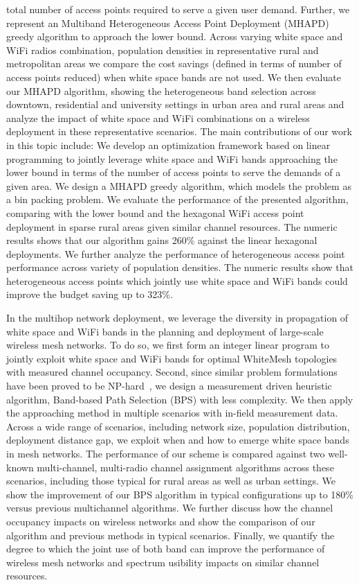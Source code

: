 total number of access points required to serve a given user demand. Further, we represent 
an Multiband Heterogeneous Access Point Deployment (MHAPD) greedy algorithm to approach the 
lower bound. Across varying white space and WiFi radios combination, population densities 
in representative rural and metropolitan areas we compare the cost savings (defined in terms 
of number of access points reduced) when white space bands are not used. We then evaluate our 
MHAPD algorithm, showing the heterogeneous band selection across downtown, residential and 
university settings in urban area and rural areas and analyze the impact of white space and 
WiFi combinations on a wireless deployment in these representative scenarios.
The main contributions of our work in this topic include: We develop an optimization framework 
based on linear programming to jointly leverage white space and WiFi bands approaching 
the lower bound in terms of the number of access points to serve the demands of a given 
area. We design a MHAPD greedy algorithm, which models the problem as a bin packing problem. 
We evaluate the performance of the presented algorithm, comparing with the lower bound and the 
hexagonal WiFi access point deployment in sparse rural areas given similar channel resources. 
The numeric results shows that our algorithm gains 260\% against the linear hexagonal deployments.  
We further analyze the performance of heterogeneous access point performance across variety 
of population densities. The numeric results show that heterogeneous access points which 
jointly use white space and WiFi bands could improve the budget saving up to 323\%. 

In the multihop network deployment, we leverage the diversity in propagation of white 
space and WiFi bands in the planning and deployment of large-scale wireless mesh 
networks. To do so, we first form an integer linear program to jointly exploit white 
space and WiFi bands for optimal WhiteMesh topologies with measured channel occupancy. 
Second, since similar problem formulations have been proved to be NP-hard~\cite{jain2005impact}, 
we design a measurement driven heuristic algorithm, Band-based Path Selection (BPS) 
with less complexity. We then apply the approaching method in multiple scenarios with 
in-field measurement data. Across a wide range of scenarios, including network size, 
population distribution, deployment distance gap, we exploit when and  how to emerge white 
space bands in mesh networks. The performance of our scheme is compared against two 
well-known multi-channel, multi-radio channel assignment algorithms across these scenarios, 
including those typical for rural areas as well as urban settings. We show the improvement 
of our BPS algorithm in typical configurations up to 180\% versus previous multichannel 
algorithms. We further discuss how the channel occupancy impacts on wireless networks and 
show the comparison of our algorithm and previous methods in typical scenarios. Finally, we 
quantify the degree to which the joint use of both band can improve the performance of 
wireless mesh networks and spectrum usibility impacts on similar channel resources. 



